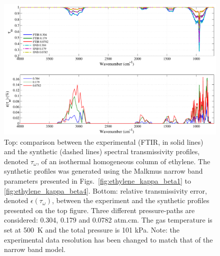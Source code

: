 \begin{figure}[p]
\includegraphics[width=\textwidth]{Figures/Comparison_Fit_Ethylene_MALKMUS_Temp500K.pdf}
\caption{Top: comparison between the experimental (FTIR, in solid lines) and the synthetic (dashed lines) spectral transmissivity profiles, denoted $\tau_{\omega}$, of an isothermal homogeneous column of ethylene. The synthetic profiles was generated using the Malkmus narrow band parameters presented in Figs.~\ref{fig:ethylene_kappa_beta1} to \ref{fig:ethylene_kappa_beta4}. Bottom: relative transmissivity error, denoted $\epsilon{(\tau_{\omega})}$, between the experiment and the synthetic profiles presented on the top figure. Three different pressure-paths are considered: 0.304, 0.179 and 0.0782 atm.cm. The gas temperature is set at 500~K and the total pressure is 101 kPa. Note: the experimental data resolution has been changed to match that of the narrow band model. \label{fig:ethylene_SNBVerify_500K}}
\end{figure}

